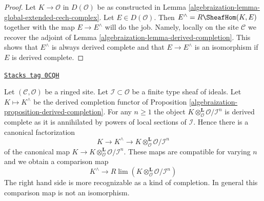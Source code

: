 \begin{proof}

Let $K \to \mathcal{O}$ in $D(\mathcal{O})$ be as constructed in
Lemma \ref{algebraization-lemma-global-extended-cech-complex}. Let $E \in D(\mathcal{O})$.
Then $E^\wedge = R\SheafHom(K, E)$ together with the map $E \to E^\wedge$
will do the job. Namely, locally on the site $\mathcal{C}$ we
recover the adjoint of Lemma \ref{algebraization-lemma-derived-completion}.
This shows that $E^\wedge$ is always derived complete and that
$E \to E^\wedge$ is an isomorphism if $E$ is derived complete.
\end{proof}

\begin{remark}

\label{algebraization-remark-compare-with-completion}
\href{https://stacks.math.columbia.edu/tag/0CQH}{\texttt{Stacks tag 0CQH}}

Let $(\mathcal{C}, \mathcal{O})$ be a ringed site.
Let $\mathcal{I} \subset \mathcal{O}$ be a finite type sheaf of
ideals. Let $K \mapsto K^\wedge$ be the derived completion functor
of Proposition \ref{algebraization-proposition-derived-completion}.
For any $n \geq 1$ the object
$K \otimes_\mathcal{O}^\mathbf{L} \mathcal{O}/\mathcal{I}^n$
is derived complete as it is annihilated by powers of
local sections of $\mathcal{I}$. Hence there is a canonical factorization
$$
K \to K^\wedge \to K \otimes_\mathcal{O}^\mathbf{L} \mathcal{O}/\mathcal{I}^n
$$
of the canonical map
$K \to K \otimes_\mathcal{O}^\mathbf{L} \mathcal{O}/\mathcal{I}^n$.
These maps are compatible for varying $n$ and we obtain a comparison map
$$
K^\wedge
\longrightarrow
R\lim \left(K \otimes_\mathcal{O}^\mathbf{L} \mathcal{O}/\mathcal{I}^n\right)
$$
The right hand side is more recognizable as a kind of completion.
In general this comparison map is not an isomorphism.
\end{remark}

